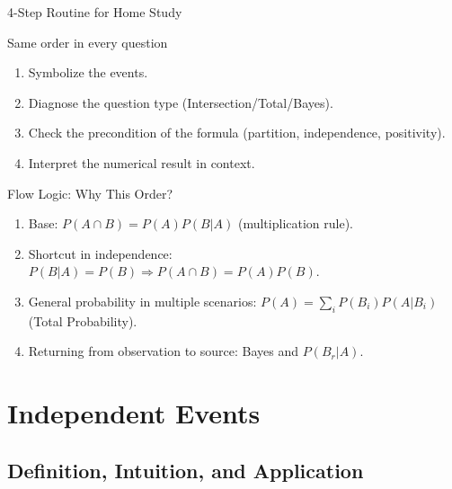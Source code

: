 \documentclass[light]{lutbeamer}
\begin{document}
\begin{frame}{4-Step Routine for Home Study}
    \begin{block}{Same order in every question}
        \begin{enumerate}
            \item Symbolize the events.
            \item Diagnose the question type (Intersection/Total/Bayes).
            \item Check the precondition of the formula (partition, independence, positivity).
            \item Interpret the numerical result in context.
        \end{enumerate}
    \end{block}
\end{frame}

\begin{frame}{Flow Logic: Why This Order?}
    \begin{enumerate}
        \item Base: \(P(A\cap B)=P(A)P(B|A)\) (multiplication rule).
        \item Shortcut in independence: \(P(B|A)=P(B)\Rightarrow P(A\cap B)=P(A)P(B)\).
        \item General probability in multiple scenarios: \(P(A)=\sum_i P(B_i)P(A|B_i)\) (Total Probability).
        \item Returning from observation to source: Bayes and \(P(B_r|A)\).
    \end{enumerate}
\end{frame}

\section{Independent Events}
\subsection{Definition, Intuition, and Application}
\end{document}
